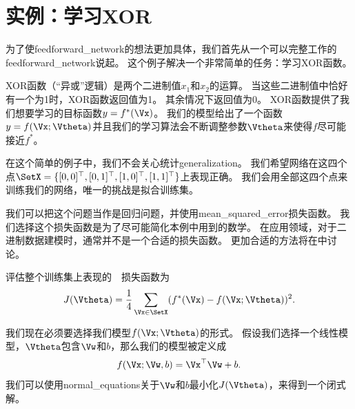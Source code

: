 \section{实例：学习XOR}
\label{sec:example_learning_xor}

为了使\gls{feedforward_network}的想法更加具体，我们首先从一个可以完整工作的\gls{feedforward_network}说起。
这个例子解决一个非常简单的任务：学习XOR函数。

XOR函数（``异或''逻辑）是两个二进制值$x_1$和$x_2$的运算。
当这些二进制值中恰好有一个为1时，XOR函数返回值为1。
其余情况下返回值为0。
XOR函数提供了我们想要学习的目标函数$y = f^*(\Vx)$。
我们的模型给出了一个函数$y=f(\Vx; \Vtheta)$并且我们的学习算法会不断调整参数$\Vtheta$来使得$f$尽可能接近$f^*$。

在这个简单的例子中，我们不会关心统计\gls{generalization}。
我们希望网络在这四个点$\SetX =\{[0, 0]^\top, [0, 1]^\top, [1, 0]^\top, [1, 1]^\top\}$上表现正确。
我们会用全部这四个点来训练我们的网络，唯一的挑战是拟合训练集。

我们可以把这个问题当作是回归问题，并使用\gls{mean_squared_error}损失函数。
我们选择这个损失函数是为了尽可能简化本例中用到的数学。
在应用领域，对于二进制数据建模时，通常并不是一个合适的损失函数。
更加合适的方法将在中讨论。


评估整个训练集上表现的~~损失函数为
\begin{equation}
J(\Vtheta) = \frac{1}{4} \sum_{\Vx\in \SetX} (f^*(\Vx) - f(\Vx; \Vtheta))^2.
\end{equation}

我们现在必须要选择我们模型$f(\Vx; \Vtheta)$的形式。
假设我们选择一个线性模型，$\Vtheta$包含$\Vw$和$b$，那么我们的模型被定义成
\begin{equation}
f(\Vx; \Vw, b) = \Vx^\top \Vw + b.
\end{equation}
我们可以使用\gls{normal_equations}关于$\Vw$和$b$最小化$J(\Vtheta)$，来得到一个闭式解。

